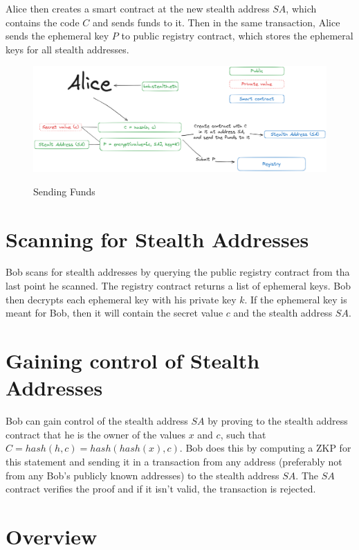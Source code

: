 Alice then creates a smart contract at the new stealth address $SA$, which contains
the code $C$ and sends funds to it. Then in the same transaction, Alice sends
the ephemeral key $P$ to public registry contract, which stores the ephemeral
keys for all stealth addresses.

\begin{figure}[h]
    \centering
    \includegraphics[scale=0.20]{assets/images/sending-funds.png}
    \caption{Sending Funds}
    \label{fig:sending-funds}
	\cite{ButerinIncompleteGuide}
    \vspace{0.5cm}
\end{figure}

\section{Scanning for Stealth Addresses}

Bob scans for stealth addresses by querying the public registry contract
from tha last point he scanned. The registry contract returns a list of
ephemeral keys. Bob then decrypts each ephemeral key with his private key $k$.
If the ephemeral key is meant for Bob, then it will contain the secret value
$c$ and the stealth address $SA$.

\section{Gaining control of Stealth Addresses}

Bob can gain control of the stealth address $SA$ by proving to the stealth
address contract that he is the owner of the values $x$ and $c$, such that\\
$C = hash(h, c) = hash(hash(x), c)$. Bob does this by computing a ZKP for 
this statement and sending it in a transaction from any address (preferably
not from any Bob's publicly known addresses) to the stealth address $SA$. The
$SA$ contract verifies the proof and if it isn't valid, the transaction is
rejected.

\section{Overview}

